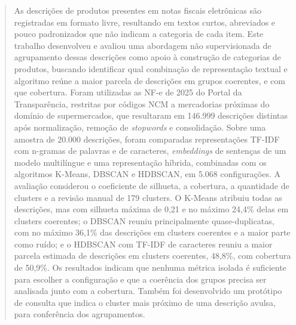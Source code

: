 \documentclass[english,brazilian]{UNISINOSmonografia}
\begin{document}
\capa
\folhaderosto


\begin{abstract}
As descrições de produtos presentes em notas fiscais eletrônicas são registradas em formato livre, resultando em textos curtos, abreviados e pouco padronizados que não indicam a categoria de cada item. Este trabalho desenvolveu e avaliou uma abordagem não supervisionada de agrupamento dessas descrições como apoio à construção de categorias de produtos, buscando identificar qual combinação de representação textual e algoritmo reúne a maior parcela de descrições em grupos coerentes, e com que cobertura. Foram utilizadas as NF-e de 2025 do Portal da Transparência, restritas por códigos NCM a mercadorias próximas do domínio de supermercados, que resultaram em 146.999 descrições distintas após normalização, remoção de \textit{stopwords} e consolidação. Sobre uma amostra de 20.000 descrições, foram comparadas representações TF-IDF com n-gramas de palavras e de caracteres, \textit{embeddings} de sentenças de um modelo multilíngue e uma representação híbrida, combinadas com os algoritmos K-Means, DBSCAN e HDBSCAN, em 5.068 configurações. A avaliação considerou o coeficiente de silhueta, a cobertura, a quantidade de clusters e a revisão manual de 179 clusters. O K-Means atribuiu todas as descrições, mas com silhueta máxima de 0,21 e no máximo 24,4\% delas em clusters coerentes; o DBSCAN reuniu principalmente quase-duplicatas, com no máximo 36,1\% das descrições em clusters coerentes e a maior parte como ruído; e o HDBSCAN com TF-IDF de caracteres reuniu a maior parcela estimada de descrições em clusters coerentes, 48,8\%, com cobertura de 50,9\%. Os resultados indicam que nenhuma métrica isolada é suficiente para escolher a configuração e que a coerência dos grupos precisa ser analisada junto com a cobertura. Também foi desenvolvido um protótipo de consulta que indica o cluster mais próximo de uma descrição avulsa, para conferência dos agrupamentos.
\end{abstract}
\end{document}
